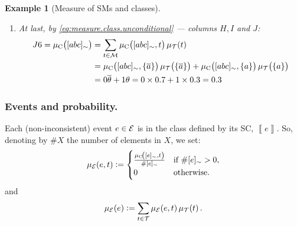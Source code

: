 \documentclass[a4paper]{article}
\newtheorem{example}{Example}
\newtheorem{example}{Example}
\newcommand{\eat}[1]{}
\newcommand{\at}[1]{\ensuremath{\!\del{#1}}}        %
\newcommand{\cla}[1]{\ensuremath{{\cal #1}}}        %
\newcommand{\co}[1]{\ensuremath{\overline{#1}}}     %
\newcommand{\TCHOICEset}{\ensuremath{\cla{T}}}
\newcommand{\MODELset}{\ensuremath{\cla{M}}}
\newcommand{\EVENTSset}{\ensuremath{\cla{E}}}
\newcommand{\pwT}{\ensuremath{\mu_{\TCHOICEset}}}
\newcommand{\pwt}[1]{\ensuremath{\pwT\at{#1}}}
\newcommand{\pwC}{\ensuremath{\mu_{\textrm{C}}}}
\newcommand{\pwc}[1]{\ensuremath{\pwC\at{#1}}}
\newcommand{\pwE}{\ensuremath{\mu_{\EVENTSset}}}
\newcommand{\pwe}[1]{\ensuremath{\pwE\at{#1}}}
\newcommand{\stablecore}[1]{\ensuremath{\left\llbracket #1 \right\rrbracket}}
\newcommand{\class}[1]{\ensuremath{[{#1}]_{\sim}}}
\newcommand{\LOOK}{\ensuremath{\blacksquare}}
\newcommand{\franc}[1]{{\color{green!30!black}#1}}
\begin{document}
{\begin{example}[Measure of \aclp{SM} and classes]
\begin{enumerate}
\begin{equation*}
                    \begin{aligned}
                        H6 & = \pwc{\class{abc}, \set{\co{a}}} & = 0 + 0                &  & = 0 \\
                        I6 & = \pwc{\class{abc}, \set{a}}      & = \theta + \co{\theta} &  & = 1
                    \end{aligned}
                \end{equation*}
          \item At last, by \cref{eq:measure.class.unconditional} --- columns \(H, I\) and \(J\):
                \begin{equation*}
                    \begin{split}
                        J6 = \pwc{\class{abc}} &= \sum_{t\in\MODELset} \pwc{\class{abc}, t}\pwt{t} \\
                        &=  \pwc{\class{abc}, \set{\co{a}}}\pwt{\set{\co{a}}} +
                        \pwc{\class{abc}, \set{a}}\pwt{\set{a}}  \\
                        &=  0 \co{\theta} +  1 \theta =  0 \times 0.7 +  1\times 0.3 = 0.3
                    \end{split}
                \end{equation*}
      \end{enumerate}
  \end{example}
}
%
\subsubsection*{Events and probability.}\label{sssec:propagation.event.cases}

Each (non-inconsistent) event \(e \in \EVENTSset\) is in the class defined by its \acl{SC}, \(\stablecore{e}\).  So, denoting by $\# X$ the number of elements in \(X\), we set:
\begin{equation}
  \pwe{e, t} :=
  \begin{cases}
      \frac{\pwc{\class{e}, t}}{\# \class{e}} & \text{if~}\# \class{e} > 0, \\
      0                                       & \text{otherwise}.
  \end{cases}
  \label{eq:measure.events}
\end{equation}
and
\begin{equation}
  \pwe{e} := \sum_{t\in\TCHOICEset} \pwe{e, t} \pwt{t}.
  \label{eq:measure.events.unconditional}
\end{equation}

\eat{
    \franc{\LOOK~\textbf{repeated?}~The \(\theta_{s,t}\) parameters in \cref{eq:measure.stablemodel} express the \emph{program's} lack of information about the measure assignment, when a single \acl{TC} entails more than one \acl{SM}.  In that case, how to distribute the respective measures? Our proposal to address this problem consists in assigning a parameter, \(\theta_{s,t}\), conditional on the \acl{TC}, \(t\), to each \acl{SM} \(s\).  This approach allows the expression of an unknown quantity and future estimation, given more information, \textit{e.g.} observed data.
    }
}
\end{document}
